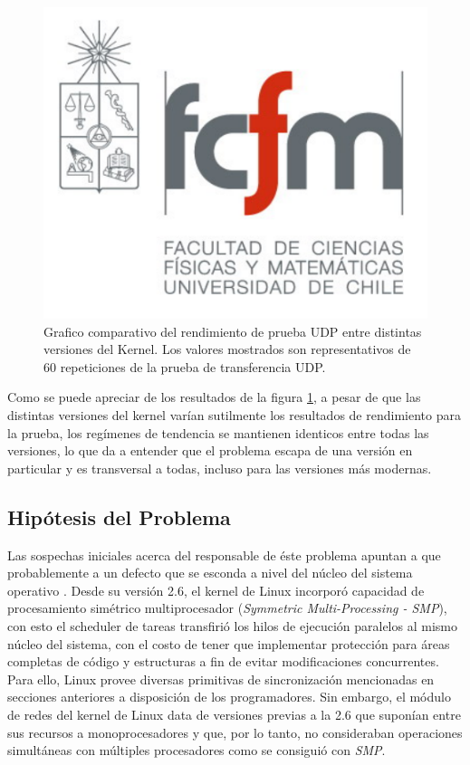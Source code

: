 \begin{figure}[h!]
	\centering
	\includegraphics[scale=0.3]{imagenes/fcfm}
	\caption{Grafico comparativo del rendimiento de prueba UDP entre distintas versiones del Kernel. Los valores mostrados son representativos de 60 repeticiones de la prueba de transferencia UDP.}
	\label{fig:tests_kernel}
\end{figure}

Como se puede apreciar de los resultados de la figura \ref{fig:tests_kernel}, a pesar de que las distintas versiones del kernel varían sutilmente los resultados de rendimiento para la prueba, los regímenes de tendencia se mantienen identicos entre todas las versiones, lo que da a entender que el problema escapa de una versión en particular y es transversal a todas, incluso para las versiones más modernas.

\subsection{Hipótesis del Problema}
Las sospechas iniciales acerca del responsable de éste problema apuntan a que probablemente a un defecto que se esconda a nivel del núcleo del sistema operativo \cite{paper:toshiba,post:facebook}. Desde su versión 2.6, el kernel de Linux incorporó capacidad de procesamiento simétrico multiprocesador (\emph{Symmetric Multi-Processing - SMP}), con esto el scheduler de tareas transfirió los hilos de ejecución paralelos al mismo núcleo del sistema, con el costo de tener que implementar protección para áreas completas de código y estructuras a fin de evitar modificaciones concurrentes. Para ello, Linux provee diversas primitivas de sincronización mencionadas en secciones anteriores a disposición de los programadores. Sin embargo, el módulo de redes del kernel de Linux data de versiones previas a la 2.6 que suponían entre sus recursos a monoprocesadores y que, por lo tanto, no consideraban operaciones simultáneas con múltiples procesadores como se consiguió con \emph{SMP}.

